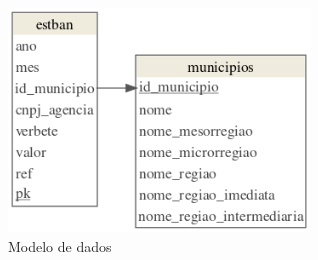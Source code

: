 \begin{anexosenv}
\begin{lstlisting}[frame=single]
\end{lstlisting}

\begin{figure}[h]
  \caption{Modelo de dados}
  \label{fig-data_model}
  \begin{center}
    \includegraphics[width=8cm]{img/data_model.png}
  \end{center}
\end{figure}

\end{anexosenv}

\printindex
